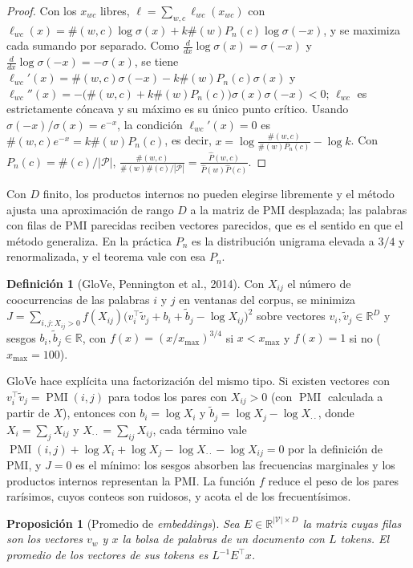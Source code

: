 \documentclass[11pt,a4paper]{article}
\theoremstyle{plain}
\newtheorem{proposicion}[teorema]{Proposición}
\theoremstyle{definition}
\newtheorem{definicion}[teorema]{Definición}
\theoremstyle{remark}
\newcommand{\R}{\mathbb{R}}
\newcommand{\PMI}{\operatorname{PMI}}
\newcommand{\1}{\mathbf{1}}
\begin{document}
\begin{proof}
Con los $x_{wc}$ libres, $\ell=\sum_{w,c}\ell_{wc}(x_{wc})$ con
$\ell_{wc}(x)=\#(w,c)\log\sigma(x)+k\#(w)P_n(c)\log\sigma(-x)$, y se
maximiza cada sumando por separado. Como $\frac{d}{dx}\log\sigma(x)=\sigma(-x)$
y $\frac{d}{dx}\log\sigma(-x)=-\sigma(x)$, se tiene
$\ell_{wc}'(x)=\#(w,c)\sigma(-x)-k\#(w)P_n(c)\sigma(x)$ y
$\ell_{wc}''(x)=-\bigl(\#(w,c)+k\#(w)P_n(c)\bigr)\sigma(x)\sigma(-x)<0$;
$\ell_{wc}$ es estrictamente cóncava y su máximo es su único punto
crítico. Usando $\sigma(-x)/\sigma(x)=e^{-x}$, la condición $\ell_{wc}'(x)=0$
es $\#(w,c)e^{-x}=k\#(w)P_n(c)$, es decir,
$x=\log\frac{\#(w,c)}{\#(w)P_n(c)}-\log k$. Con $P_n(c)=\#(c)/|\mathcal
P|$, $\frac{\#(w,c)}{\#(w)\#(c)/|\mathcal P|}=\frac{\hat P(w,c)}{\hat
P(w)\hat P(c)}$.
\end{proof}

Con $D$ finito, los productos internos no pueden elegirse libremente y el
método ajusta una aproximación de rango $D$ a la matriz de PMI desplazada;
las palabras con filas de PMI parecidas reciben vectores parecidos, que es
el sentido en que el método generaliza. En la práctica $P_n$ es la
distribución unigrama elevada a $3/4$ y renormalizada, y el teorema vale
con esa $P_n$.

\begin{definicion}[GloVe, Pennington et al., 2014]
Con $X_{ij}$ el número de coocurrencias de las palabras $i$ y $j$ en
ventanas del corpus, se minimiza
$J=\sum_{i,j:X_{ij}>0}f(X_{ij})\bigl(v_i^\top\tilde v_j+b_i+\tilde
b_j-\log X_{ij}\bigr)^2$ sobre vectores $v_i,\tilde v_j\in\R^D$ y sesgos
$b_i,\tilde b_j\in\R$, con $f(x)=(x/x_{\max})^{3/4}$ si $x<x_{\max}$ y
$f(x)=1$ si no ($x_{\max}=100$).
\end{definicion}

GloVe hace explícita una factorización del mismo tipo. Si existen
vectores con $v_i^\top\tilde v_j=\PMI(i,j)$ para todos los pares con
$X_{ij}>0$ (con $\PMI$ calculada a partir de $X$), entonces con
$b_i=\log X_i$ y $\tilde b_j=\log X_j-\log X_{\cdot\cdot}$, donde
$X_i=\sum_jX_{ij}$ y $X_{\cdot\cdot}=\sum_{ij}X_{ij}$, cada término vale
$\PMI(i,j)+\log X_i+\log X_j-\log X_{\cdot\cdot}-\log X_{ij}=0$ por la
definición de PMI, y $J=0$ es el mínimo: los sesgos absorben las
frecuencias marginales y los productos internos representan la PMI. La
función $f$ reduce el peso de los pares rarísimos, cuyos conteos son
ruidosos, y acota el de los frecuentísimos.

\begin{proposicion}[Promedio de \emph{embeddings}]\label{prop:promedio}
Sea $E\in\R^{|\mathcal V|\times D}$ la matriz cuyas filas son los vectores
$v_w$ y $x$ la bolsa de palabras de un documento con $L$ tokens. El
promedio de los vectores de sus tokens es $L^{-1}E^\top x$.
\end{proposicion}
\end{document}
